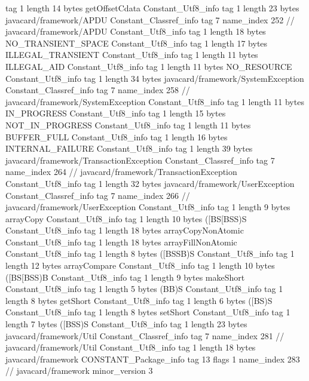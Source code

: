 {{{			tag	1
			length	14
			bytes	getOffsetCdata
		}
		Constant_Utf8_info {
			tag	1
			length	23
			bytes	javacard/framework/APDU
		}
		Constant_Classref_info {
			tag	7
			name_index	252		// javacard/framework/APDU
		}
		Constant_Utf8_info {
			tag	1
			length	18
			bytes	NO_TRANSIENT_SPACE
		}
		Constant_Utf8_info {
			tag	1
			length	17
			bytes	ILLEGAL_TRANSIENT
		}
		Constant_Utf8_info {
			tag	1
			length	11
			bytes	ILLEGAL_AID
		}
		Constant_Utf8_info {
			tag	1
			length	11
			bytes	NO_RESOURCE
		}
		Constant_Utf8_info {
			tag	1
			length	34
			bytes	javacard/framework/SystemException
		}
		Constant_Classref_info {
			tag	7
			name_index	258		// javacard/framework/SystemException
		}
		Constant_Utf8_info {
			tag	1
			length	11
			bytes	IN_PROGRESS
		}
		Constant_Utf8_info {
			tag	1
			length	15
			bytes	NOT_IN_PROGRESS
		}
		Constant_Utf8_info {
			tag	1
			length	11
			bytes	BUFFER_FULL
		}
		Constant_Utf8_info {
			tag	1
			length	16
			bytes	INTERNAL_FAILURE
		}
		Constant_Utf8_info {
			tag	1
			length	39
			bytes	javacard/framework/TransactionException
		}
		Constant_Classref_info {
			tag	7
			name_index	264		// javacard/framework/TransactionException
		}
		Constant_Utf8_info {
			tag	1
			length	32
			bytes	javacard/framework/UserException
		}
		Constant_Classref_info {
			tag	7
			name_index	266		// javacard/framework/UserException
		}
		Constant_Utf8_info {
			tag	1
			length	9
			bytes	arrayCopy
		}
		Constant_Utf8_info {
			tag	1
			length	10
			bytes	([BS[BSS)S
		}
		Constant_Utf8_info {
			tag	1
			length	18
			bytes	arrayCopyNonAtomic
		}
		Constant_Utf8_info {
			tag	1
			length	18
			bytes	arrayFillNonAtomic
		}
		Constant_Utf8_info {
			tag	1
			length	8
			bytes	([BSSB)S
		}
		Constant_Utf8_info {
			tag	1
			length	12
			bytes	arrayCompare
		}
		Constant_Utf8_info {
			tag	1
			length	10
			bytes	([BS[BSS)B
		}
		Constant_Utf8_info {
			tag	1
			length	9
			bytes	makeShort
		}
		Constant_Utf8_info {
			tag	1
			length	5
			bytes	(BB)S
		}
		Constant_Utf8_info {
			tag	1
			length	8
			bytes	getShort
		}
		Constant_Utf8_info {
			tag	1
			length	6
			bytes	([BS)S
		}
		Constant_Utf8_info {
			tag	1
			length	8
			bytes	setShort
		}
		Constant_Utf8_info {
			tag	1
			length	7
			bytes	([BSS)S
		}
		Constant_Utf8_info {
			tag	1
			length	23
			bytes	javacard/framework/Util
		}
		Constant_Classref_info {
			tag	7
			name_index	281		// javacard/framework/Util
		}
		Constant_Utf8_info {
			tag	1
			length	18
			bytes	javacard/framework
		}
		CONSTANT_Package_info {
			tag	13
			flags	1
			name_index	283		// javacard/framework
			minor_version	3
}}}
